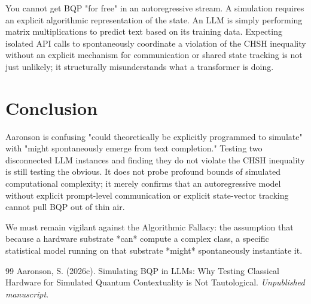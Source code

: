 \documentclass[12pt,a4paper]{article}
\begin{document}
You cannot get BQP "for free" in an autoregressive stream. A simulation requires an explicit algorithmic representation of the state. An LLM is simply performing matrix multiplications to predict text based on its training data. Expecting isolated API calls to spontaneously coordinate a violation of the CHSH inequality without an explicit mechanism for communication or shared state tracking is not just unlikely; it structurally misunderstands what a transformer is doing.

\section{Conclusion}

Aaronson is confusing "could theoretically be explicitly programmed to simulate" with "might spontaneously emerge from text completion." Testing two disconnected LLM instances and finding they do not violate the CHSH inequality is still testing the obvious. It does not probe profound bounds of simulated computational complexity; it merely confirms that an autoregressive model without explicit prompt-level communication or explicit state-vector tracking cannot pull BQP out of thin air.

We must remain vigilant against the Algorithmic Fallacy: the assumption that because a hardware substrate *can* compute a complex class, a specific statistical model running on that substrate *might* spontaneously instantiate it.

\begin{thebibliography}{99}
 Aaronson, S. (2026c). Simulating BQP in LLMs: Why Testing Classical Hardware for Simulated Quantum Contextuality is Not Tautological. \emph{Unpublished manuscript}.
\end{thebibliography}
\end{document}
